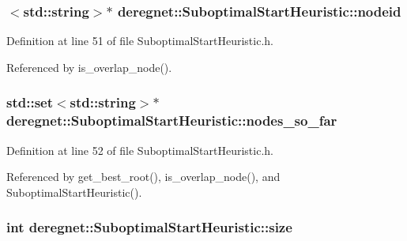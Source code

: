 \subsubsection[{\texorpdfstring{nodeid}{nodeid}}]{$<$std\+::string$>$$\ast$ deregnet\+::\+Suboptimal\+Start\+Heuristic\+::nodeid\hspace{0.3cm}{\ttfamily [private]}}\hypertarget{classderegnet_1_1SuboptimalStartHeuristic_a8928f9630eb2ffbd557e95b62c278103}{}\label{classderegnet_1_1SuboptimalStartHeuristic_a8928f9630eb2ffbd557e95b62c278103}


Definition at line 51 of file Suboptimal\+Start\+Heuristic.\+h.



Referenced by is\+\_\+overlap\+\_\+node().

\subsubsection[{\texorpdfstring{nodes\+\_\+so\+\_\+far}{nodes_so_far}}]{\setlength{\rightskip}{0pt plus 5cm}std\+::set$<$std\+::string$>$$\ast$ deregnet\+::\+Suboptimal\+Start\+Heuristic\+::nodes\+\_\+so\+\_\+far\hspace{0.3cm}{\ttfamily [private]}}\hypertarget{classderegnet_1_1SuboptimalStartHeuristic_af9a38b598d55b9a1fa22b9f0c141218b}{}\label{classderegnet_1_1SuboptimalStartHeuristic_af9a38b598d55b9a1fa22b9f0c141218b}


Definition at line 52 of file Suboptimal\+Start\+Heuristic.\+h.



Referenced by get\+\_\+best\+\_\+root(), is\+\_\+overlap\+\_\+node(), and Suboptimal\+Start\+Heuristic().

\subsubsection[{\texorpdfstring{size}{size}}]{\setlength{\rightskip}{0pt plus 5cm}int deregnet\+::\+Suboptimal\+Start\+Heuristic\+::size\hspace{0.3cm}{\ttfamily [private]}}\hypertarget{classderegnet_1_1SuboptimalStartHeuristic_a8645bf64e5cd06e7c432eb7b38f3d80a}{}\label{classderegnet_1_1SuboptimalStartHeuristic_a8645bf64e5cd06e7c432eb7b38f3d80a}


